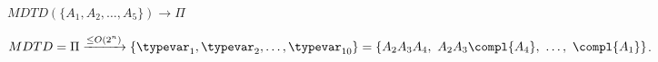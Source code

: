   
  

  
  
  

  
  
  

\begin{frame}[t]{$MDTD( \{A_1, A_2, \ldots, A_5\})\to\Pi$}
  \scalebox{0.7}{\usebox\boxforestAnu}
  
  \medskip
  
  $MDTD=\Pi \xrightarrow{\leq O(2^n)} \{\typevar_1, \typevar_2, \ldots, \typevar_{10}\} = \{A_2 A_3 A_4,~ A_2 A_3 \compl{A_4}, ~\ldots,~ \compl{A_1}\}$.  
\end{frame}

